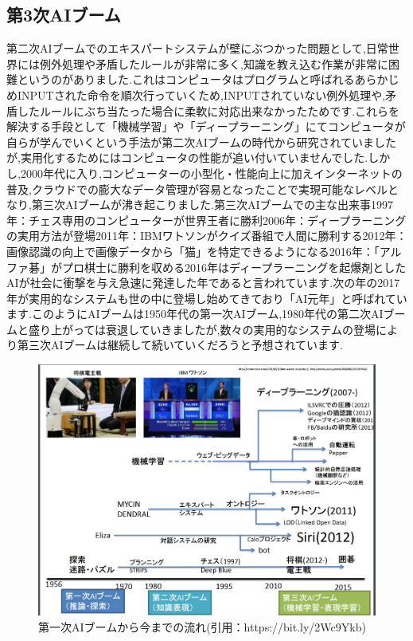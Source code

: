 \subsection{第3次AIブーム}
第二次AIブームでのエキスパートシステムが壁にぶつかった問題として,日常世界には例外処理や矛盾したルールが非常に多く,知識を教え込む作業が非常に困難というのがありました.これはコンピュータはプログラムと呼ばれるあらかじめINPUTされた命令を順次行っていくため,INPUTされていない例外処理や,矛盾したルールにぶち当たった場合に柔軟に対応出来なかったためです.これらを解決する手段として「機械学習」や「ディープラーニング」にてコンピュータが自らが学んでいくという手法が第二次AIブームの時代から研究されていましたが,実用化するためにはコンピュータの性能が追い付いていませんでした.しかし,2000年代に入り,コンピューターの小型化・性能向上に加えインターネットの普及,クラウドでの膨大なデータ管理が容易となったことで実現可能なレベルとなり,第三次AIブームが沸き起こりました.第三次AIブームでの主な出来事1997年：チェス専用のコンピューターが世界王者に勝利2006年：ディープラーニングの実用方法が登場2011年：IBMワトソンがクイズ番組で人間に勝利する2012年：画像認識の向上で画像データから「猫」を特定できるようになる2016年：「アルファ碁」がプロ棋士に勝利を収める2016年はディープラーニングを起爆剤としたAIが社会に衝撃を与え急速に発達した年であると言われています.次の年の2017年が実用的なシステムも世の中に登場し始めてきており「AI元年」と呼ばれています.このようにAIブームは1950年代の第一次AIブーム,1980年代の第二次AIブームと盛り上がっては衰退していきましたが,数々の実用的なシステムの登場により第三次AIブームは継続して続いていくだろうと予想されています.\\
\begin{figure}[!ht]
    \begin{screen}
    \begin{center}
        \includegraphics[scale=0.4, clip]{./img/AI_History.png}
        \caption{第一次AIブームから今までの流れ\newline(引用：https://bit.ly/2Wc9Ykb)}
        \label{fig:第一次AIブームから今までの流れ}
    \end{center}
\end{screen}
\end{figure}\\
